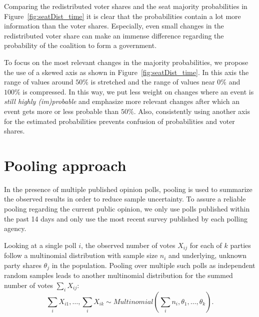 \documentclass[smallcondensed]{svjour3}     %
\begin{document}
Comparing the redistributed voter shares and the seat majority probabilities
in Figure~\ref{fig:seatDist_time} it is clear that the probabilities contain
a lot more information than the voter shares. Especially, even small changes
in the redistributed voter share can make an immense difference regarding the
probability of the coalition to form a government.

To focus on the most relevant changes in the majority probabilities, we propose
the use of a skewed axis as shown in Figure~\ref{fig:seatDist_time}. In this axis
the range of values around $50\%$ is stretched and the range of values near
$0\%$ and $100\%$ is compressed. In this way, we put less weight on changes
where an event is {\it still highly (im)probable} and emphasize more relevant
changes after which an event gets more or less probable than $50\%$. Also,
consistently using another axis for the estimated probabilities prevents
confusion of probabilities and voter shares.



\section{Pooling approach} \label{sec:pooling}
In the presence of multiple published opinion polls, pooling is used to
summarize the observed results in order to reduce sample uncertainty.
To assure a reliable pooling regarding the current public opinion,
we only use polls published within the past 14 days and only use the
most recent survey published by each polling agency.

Looking at a single poll $i$, the observed number of votes $X_{ij}$ for each of $k$ parties follow a multinomial distribution with sample size $n_i$ and underlying, unknown party shares $\theta_j$ in the population.
Pooling over multiple such polls as independent random samples leads to another multinomial distribution for the summed number of votes $\sum_i X_{ij}$:
\begin{equation}
\sum\limits_i X_{i1},\ldots, \sum\limits_i X_{ik} \sim Multinomial \left( \sum\limits_i n_i,\theta_1,\ldots,\theta_k \right).
\end{equation}
\end{document}
